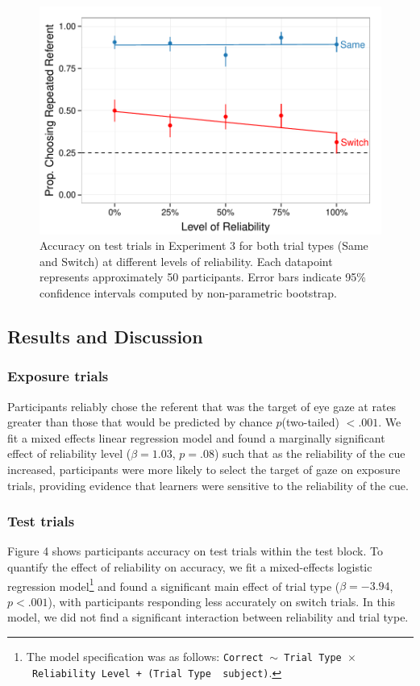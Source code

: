 \documentclass[10pt,letterpaper]{article}
\begin{document}
\begin{figure}[t!]
\begin{center}
\includegraphics[scale=0.35]{plots_figs/acc-test-expt3}
\end{center}
\caption{Accuracy on test trials in Experiment 3 for both trial types (Same and Switch) at different levels of reliability. Each datapoint represents 
approximately 50 participants. Error bars indicate 95\% confidence intervals 
computed by non-parametric bootstrap.}
\end{figure}

\subsection{Results and Discussion}

\subsubsection{Exposure trials}
Participants reliably chose the referent that was the target of eye gaze at rates greater than those that would be predicted by chance $p$(two-tailed) $< .001$. We fit a mixed effects linear regression model and found a marginally significant effect of reliability level ($\beta= 1.03$, $p=.08$) such that as the reliability of the cue increased, participants were more likely to select the target of gaze on exposure trials, providing evidence that learners were sensitive to the reliability of the cue. 

\subsubsection{Test trials}
Figure 4 shows participants accuracy on test trials within the test block.  To quantify the effect of reliability on accuracy, we fit a mixed-effects logistic regression model\footnote{The model specification was as follows: \texttt{Correct $\sim$ Trial Type~$\times$~Reliability Level + (Trial Type \textbar~subject)}.} and found a significant main effect of trial type ($\beta= -3.94$, $p<.001$), with participants responding less accurately on switch trials. In this model, we did not find a significant interaction between reliability and trial type. 
\end{document}
